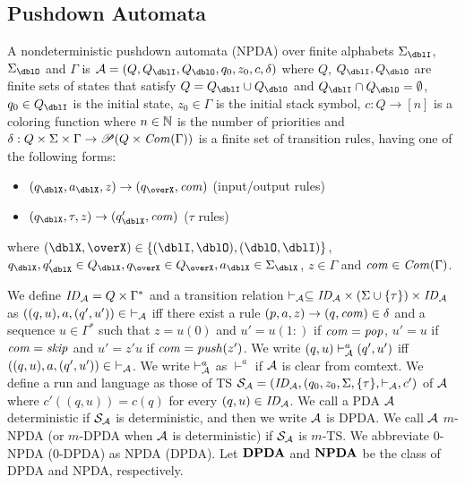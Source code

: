 \subsection{Pushdown Automata}

\begin{definition}
A nondeterministic {pushdown automata} (NPDA) over finite alphabets $\Sigma_\dblI$, $\Sigma_\dblO$ and $\Gamma$ is $\calA = (Q, Q_\dblI, Q_\dblO, q_0, z_0, c, \delta)$ where
$Q$, $Q_\dblI, Q_\dblO$ are finite sets of states that satisfy $Q=Q_\dblI\cup Q_\dblO$ and $Q_\dblI \cap Q_\dblO = \emptyset$,
$q_0\in Q_\dblI$ is the initial state,
$z_0\in \Gamma$ is the initial stack symbol,
$c: Q \to [n]$ is a coloring function where $n\in \mathbb{N}$ is the number of priorities and
$\delta: Q \times \Sigma \times \Gamma \to \mathscr{P}(Q \times \mathit{Com}(\Gamma))$ is a finite set of transition rules, having one of the following forms:
\begin{itemize}
\item $(q_\dblX, a_\dblX, z) \rightarrow (q_\overX, \com)$ (input/output rules)
\item $(q_\dblX, \tau, z)\to(q'_\dblX,\com)$ ($\tau$ rules)
\end{itemize}
where $(\dblX, \overX)\in\{(\dblI, \dblO), (\dblO,\dblI)\}$,
$q_\dblX, q'_\dblX\in Q_\dblX, q_\overX\in Q_\overX, a_\dblX\in \Sigma_\dblX$, $z\in \Gamma$ and $\mathit{com}\in \mathit{Com}(\Gamma)$.
\end{definition}
We define $\mathit{ID}_{\cal A}= Q\times \Gamma^*$ and
a transition relation $\vdash_{\cal A}\subseteq \mathit{ID}_{\cal A}\times (\Sigma\cup\{\tau\})\times \mathit{ID}_{\cal A}$ as
$((q,u),a,(q',u'))\in\ \vdash_{\cal A}$ iff there exist a rule $(p, a, z) \rightarrow (q, \mathit{com}) \in \delta$ and a sequence $u\in \Gamma^*$ such that $z=u(0)$ and $u'={u(1:)}$ if $\mathit{com}=\mathit{pop}$, $u'=u$ if $\mathit{com}=\mathit{skip}$ and $u'=z'u$ if $\mathit{com}=\mathit{push}(z')$.
We write $(q,u)\vdash^a_{\cal A}(q',u')$ iff
$((q,u),a,(q',u'))\in\ \vdash_{\cal A}$.
We write $\vdash^{a}_{\cal A}$ as $\vdash^{a}$ if ${\cal A}$ is clear from comtext.
We define a run and language as those of TS ${\cal S}_{\cal A}=(\mathit{ID}_{\cal A}, (q_0,z_0,\Sigma, \{\tau\},\vdash_{\cal A},c')$ of ${\cal A}$ where $c'((q,u))= c(q)$ for every $(q,u)\in\mathit{ID}_{\cal A}$.
We call a PDA ${\cal A}$ deterministic if ${\cal S}_{\cal A}$ is deterministic,
and then we write ${\cal A}$ is DPDA.
We call ${\cal A}$ $m$-NPDA (or $m$-DPDA when ${\cal A}$ is deterministic)
if ${\cal S}_{\cal A}$ is $m$-TS.
We abbreviate $0$-NPDA ($0$-DPDA) as NPDA (DPDA).
Let ${\bf DPDA}$ and ${\bf NPDA}$ be the class of DPDA and NPDA, respectively.

